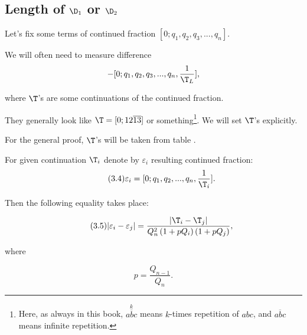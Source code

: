\subsection{Length of $\D_1$ or $\D_2$}

Let's fix some terms of continued fraction $[0; q_1, q_2, q_3, ..., q_n]$.

We will often need to measure difference
\begin{equation*}
	[0; q_1, q_2, q_3, ..., q_n, \dfrac{1}{\T_R}] - 
	[0; q_1, q_2, q_3, ..., q_n, \dfrac{1}{\T_L}],
\end{equation*}

where $\T$'s are some continuations of the continued fraction.

They generally look like $\T = [0;12\overline{13}]$ or something\footnote{%
	Here, as always in this book, $\overset{k}{\overline{abc}}$
	means $k$-times repetition of $abc$,
	and $\overline{abc}$ means infinite repetition.}.
We will set $\T$'s explicitly.

For the general proof, $\T$'s will be taken from table .

\begin{designation}
	For given continuation $\T_i$ denote by $\varepsilon_i$ resulting continued fraction:
	\begin{equation}\tag{3.4}\label{epsilon_rule}
		\varepsilon_i = [0; q_1, q_2, ..., q_n, \frac{1}{\T_i}].
	\end{equation}
\end{designation}

Then the following equality takes place:

\begin{equation}\tag{3.5}\label{varepsilons_difference}
	| \varepsilon_i - \varepsilon_j | = 
	\dfrac{| \T_i - \T_j |}
	{Q_n^2 \left(1 + pQ_i\right) \left(1 + pQ_j\right)},
\end{equation}

where

\begin{equation*}
	p = \dfrac{Q_{n-1}}{Q_n}.
\end{equation*}
